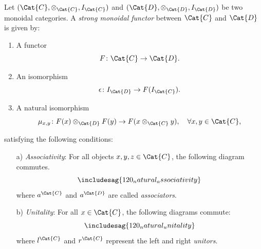 \begin{shaded}
\begin{definition}
Let $(\Cat{C},\otimes_\Cat{C},I_\Cat{C})$ and $(\Cat{D},\otimes_\Cat{D},I_\Cat{D})$ be two monoidal categories. A \emph{strong monoidal functor} between $\Cat{C}$ and $\Cat{D}$ is given by:
\begin{enumerate}
    \item A functor 
    \begin{equation}
        F\colon \Cat{C}\to \Cat{D}.
    \end{equation}
    \item An isomorphism 
    \begin{equation}
        \epsilon\colon I_\Cat{D}\to F(I_\Cat{C}).
    \end{equation}
    \item A natural isomorphism
    \begin{equation}
        \mu_{x,y}\colon F(x)\otimes_\Cat{D} F(y) \to F(x\otimes_\Cat{C} y),\quad \forall x,y\in \Cat{C},
    \end{equation}
\end{enumerate}
satisfying the following conditions:
\begin{enumerate}
    \item[a)] \emph{Associativity}: For all objects $x,y,z\in \Cat{C}$, the following diagram commutes.
    \begin{equation}
        \includesag{120_natural_associativity}
    \end{equation}
    where $a^\Cat{C}$ and $a^\Cat{D}$ are called \emph{associators}.
    \item[b)] \emph{Unitality}: For all $x\in \Cat{C}$, the following diagrams commute:
    \begin{equation}
        \includesag{120_natural_unitality}
    \end{equation}
    where $l^\Cat{C}$ and $r^\Cat{C}$ represent the left and right \emph{unitors}.
\end{enumerate}
\end{definition}
\end{shaded}
